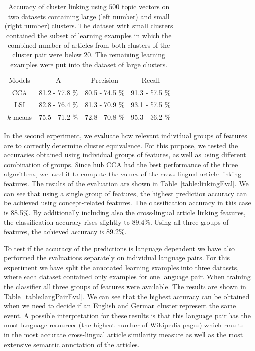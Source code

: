 \documentclass[twoside,11pt]{article}
\begin{document}
\begin{table}[h]
\caption{Accuracy of cluster linking using $500$ topic vectors on two datasets containing large (left number) and small (right number) clusters. The dataset with small clusters contained the subset of learning examples in which the combined number of articles from both clusters of the cluster pair were below 20. The remaining learning examples were put into the dataset of large clusters.}
\label{table:linkingEvalAlgosLargeSmall}
\begin{center}
\begin{tabular}{|c|c|c|c|}
  \hline
  \cline{1-4}
  Models & A & Precision & Recall \\ \cline{1-4}
  CCA      & 81.2 - 77.8 \% & 80.5 - 74.5 \%  & 91.3 - 57.5 \%  \\ \cline{1-4}
  LSI      & 82.8 - 76.4 \% & 81.3 - 70.9 \%  & 93.1 - 57.5 \%  \\ \cline{1-4}
 $k$-means & 75.5 - 71.2 \% & 72.8 - 70.8 \%  & 95.3 - 36.2 \%  \\ \cline{1-4}
\end{tabular}
\end{center}
\end{table}

In the second experiment, we evaluate how relevant individual groups of features are to correctly determine cluster equivalence. For this purpose, we tested the accuracies obtained using individual groups of features, as well as using different combination of groups. Since hub CCA had the best  performance of the three algorithms, we used it to compute the values of the cross-lingual article linking features. The results of the evaluation are shown in Table~\ref{table:linkingEval}. We can see that using a single group of features, the highest prediction accuracy can be achieved using  concept-related features. The classification accuracy in this case is 88.5\%. By additionally including also the cross-lingual article linking features, the classification accuracy rises slightly to 89.4\%. Using all three groups of features, the achieved accuracy is 89.2\%.

To test if the accuracy of the predictions is language dependent we have also performed the evaluations separately on individual language pairs. For this experiment we have split the annotated learning examples into three datasets, where each dataset contained only examples for one language pair. When training the classifier all three groups of features were available. The results are shown in Table~\ref{table:langPairEval}. We can see that the highest accuracy can be obtained when we need to decide if an English and German cluster represent the same event. A possible interpretation for these results is that this language pair has the most language resources (the highest number of Wikipedia pages) which results in the most accurate cross-lingual article similarity measure as well as the most extensive semantic annotation of the articles.
\end{document}
